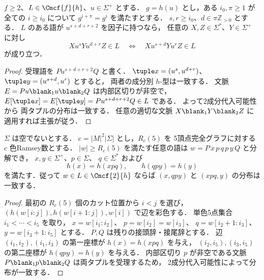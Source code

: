\begin{lemma}
\label{lem:mcfg-power-transfer}
$f\ge2$、$L\in\Cmcf{f}{h}$、$u\in\Sigma^+$ とする．
$g=h(u)$ とし，ある $i_0,\pi\ge1$ が
全ての $i\ge i_0$ について
$g^{i+\pi}=g^i$ を満たすとする．
$s,r\ge i_0$、$d\in\pi\mathbb Z_{>0}$ とする．
$L$ のある語が $u^{s+d+r+2}$ を因子に持つなら，
任意の $X,Z\in\Sigma^*$、$Y\in\Sigma^+$ に対し
\[
 Xu^sYu^{d+r}Z\in L
 \quad\Longleftrightarrow\quad
 Xu^{s+d}Yu^rZ\in L
\]
が成り立つ．
\end{lemma}
\begin{proof}
受理語を $Pu^{s+d+r+2}Q$ と書く．
$\tuple x=(u^s,u^{d+r})$、
$\tuple y=(u^{s+d},u^r)$ とすると，
両者の成分別 $h$-型は一致する．
文脈 $E=Pu\blank_1u\blank_2Q$ は内部区切りが非空で，
$E[\tuple x]=E[\tuple y]=Pu^{s+d+r+2}Q\in L$ である．
よって2成分代入可能性から
両タプルの分布は一致する．
任意の適切な文脈 $X\blank_1Y\blank_2Z$
に適用すれば主張が従う．
\end{proof}

\begin{lemma}[有界な局所シフト対]
\label{lem:mcfg-local-shift}
$\Sigma$ は空でないとする．
$c=|M|^2|\Sigma|$ とし，$R_c(5)$ を
5頂点完全グラフに対する $c$ 色Ramsey数とする．
$|w|\ge R_c(5)$ を満たす任意の語は
$w=P\,x\,p\,q\,p\,y\,Q$ と分解でき，
$x,y\in\Sigma^+$、$p\in\Sigma$、
$q\in\Sigma^*$ および
\[
 h(x)=h(xpq),\qquad h(qpy)=h(y)
\]
を満たす．従って $w\in L\in\Cmcf{2}{h}$ ならば
$(x,qpy)$ と $(xpq,y)$ の分布は一致する．
\end{lemma}
\begin{proof}
最初の $R_c(5)$ 個のカット位置から $i<j$ を選び，
$(h(w[i:j]),h(w[i+1:j]),w[i])$ で辺を彩色する．
単色5点集合 $i_1<\cdots<i_5$ を取り，
$x=w[i_1:i_2]$、
$p=w[i_2]=w[i_3]$、
$q=w[i_2+1:i_3]$、
$y=w[i_3+1:i_5]$ とする．
$P,Q$ は残りの接頭辞・接尾辞とする．
辺 $(i_1,i_2),(i_1,i_3)$ の第一座標が
$h(x)=h(xpq)$ を与え，
$(i_2,i_5),(i_3,i_5)$ の第二座標が
$h(qpy)=h(y)$ を与える．
内部区切り $p$ が非空である文脈
$P\blank_1p\blank_2Q$ は両タプルを受理するため，
2成分代入可能性によって分布が一致する．
\end{proof}

